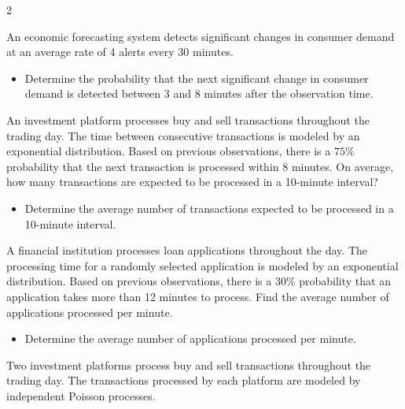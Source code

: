 \begin{multicols}{2}
		{
		An economic forecasting system detects significant changes in consumer
		demand at an average rate of 4 alerts every 30 minutes.
		
		\begin{itemize}
			\item[\textbf{(C4)}] Determine the probability that the next
			significant change in consumer demand is detected between 3 and
			8 minutes after the observation time.
		\end{itemize}
		}
		
		\columnbreak
		
		{
		An investment platform processes buy and sell transactions throughout
		the trading day. The time between consecutive transactions is modeled
		by an exponential distribution. Based on previous observations, there
		is a \(75\%\) probability that the next transaction is processed within
		8 minutes. On average, how many transactions are expected to be
		processed in a 10-minute interval?
		
		\begin{itemize}
			\item[\textbf{(C4)}] Determine the average number of transactions
			expected to be processed in a 10-minute interval.
		\end{itemize}
		}
		
		{
		A financial institution processes loan applications throughout the
		day. The processing time for a randomly selected application is
		modeled by an exponential distribution. Based on previous observations,
		there is a \(30\%\) probability that an application takes more than
		12 minutes to process. Find the average number of applications
		processed per minute.
		
		\begin{itemize}
			\item[\textbf{(C4)}] Determine the average number of applications
			processed per minute.
		\end{itemize}
		}
		
		{
			Two investment platforms process buy and sell transactions throughout
			the trading day. The transactions processed by each platform are
			modeled by independent Poisson processes.
			
}
\end{multicols}
